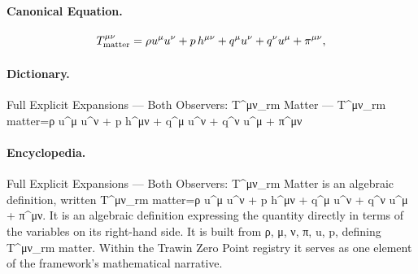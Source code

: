 \paragraph{Canonical Equation.}
\[
T^{\mu\nu}_{\rm matter}=\rho u^\mu u^\nu + p\,h^{\mu\nu} + q^\mu u^\nu + q^\nu u^\mu + \pi^{\mu\nu},
\]

\paragraph{Dictionary.}
Full Explicit Expansions — Both Observers: T\textasciicircum{}μν\_rm Matter — T\textasciicircum{}μν\_rm matter=ρ u\textasciicircum{}μ u\textasciicircum{}ν + p h\textasciicircum{}μν + q\textasciicircum{}μ u\textasciicircum{}ν + q\textasciicircum{}ν u\textasciicircum{}μ + π\textasciicircum{}μν

\paragraph{Encyclopedia.}
Full Explicit Expansions — Both Observers: T\textasciicircum{}μν\_rm Matter is an algebraic definition, written T\textasciicircum{}μν\_rm matter=ρ u\textasciicircum{}μ u\textasciicircum{}ν + p h\textasciicircum{}μν + q\textasciicircum{}μ u\textasciicircum{}ν + q\textasciicircum{}ν u\textasciicircum{}μ + π\textasciicircum{}μν. It is an algebraic definition expressing the quantity directly in terms of the variables on its right-hand side. It is built from ρ, μ, ν, π, u, p, defining T\textasciicircum{}μν\_rm matter. Within the Trawin Zero Point registry it serves as one element of the framework's mathematical narrative.
